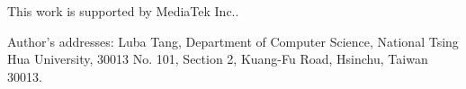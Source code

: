 \begin{bottomstuff}
This work is supported by MediaTek Inc..

Author's addresses: Luba Tang,
Department of Computer Science, National Tsing Hua University,
30013 No. 101, Section 2, Kuang-Fu Road, Hsinchu, Taiwan 30013.
\end{bottomstuff}
